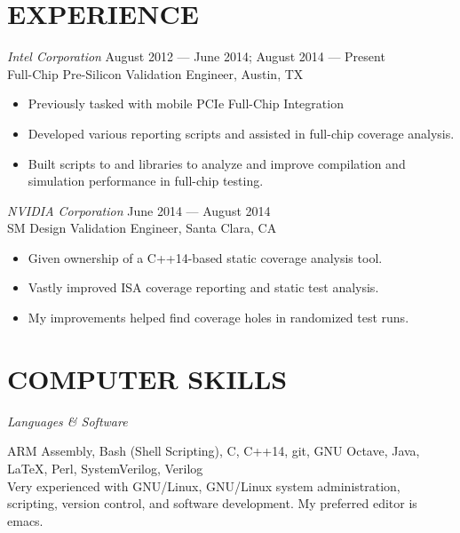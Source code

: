 \documentclass[margin]{res}
\begin{document}
\begin{resume}
  \section{EXPERIENCE}
  {\sl Intel Corporation}
  \hfill August 2012 --- June 2014; August 2014 --- Present \\
  Full-Chip Pre-Silicon Validation Engineer, Austin, TX
  \vspace{0.25em}
  \begin{itemize}
  \item Previously tasked with mobile PCIe Full-Chip Integration
  \item Developed various reporting scripts and assisted in full-chip
    coverage analysis.
  \item Built scripts to and libraries to analyze and improve
    compilation and simulation performance in full-chip testing.
  \end{itemize}
  {\sl NVIDIA Corporation}
  \hfill June 2014 --- August 2014 \\
  SM Design Validation Engineer, Santa Clara, CA
  \vspace{0.25em}
  \begin{itemize}
  \item Given ownership of a C++14-based static coverage analysis tool.
  \item Vastly improved ISA coverage reporting and static test
    analysis.
  \item My improvements helped find coverage holes in randomized test
    runs.
  \end{itemize}

  \section{COMPUTER SKILLS}
  {\sl Languages \& Software} \\
  \vspace{-1.0em}
  \begin{adjustwidth}{1.5em}{0pt}
    ARM Assembly, Bash (Shell Scripting), C, C++14, git, GNU Octave,
    Java, \LaTeX, Perl, SystemVerilog, Verilog
    \vspace{0.5em} \\
    Very experienced with GNU/Linux, GNU/Linux system administration,
    scripting, version control, and software development. My preferred
    editor is emacs.
  \end{adjustwidth}


\end{resume}
\end{document}
